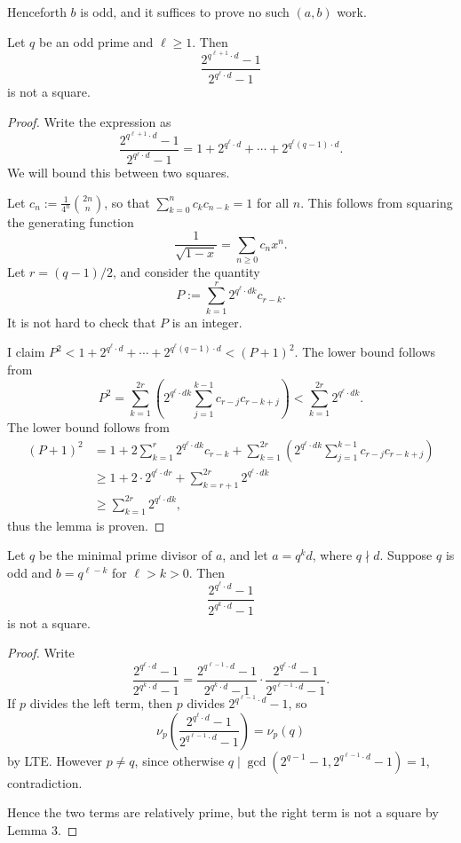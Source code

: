 Henceforth $b$ is odd, and it suffices to prove no such $(a,b)$ work.
\begin{lemma}[Problem for $a=q^\ell\cdot d$, $b=q$]
    Let $q$ be an odd prime and $\ell\ge1$. Then \[\frac{2^{q^{\ell+1}\cdot d}-1}{2^{q^\ell\cdot d}-1}\]
    is not a square.
\end{lemma}
\begin{proof}
    Write the expression as \[\frac{2^{q^{\ell+1}\cdot d}-1}{2^{q^\ell\cdot d}-1}=1+2^{q^\ell\cdot d}+\cdots+2^{q^\ell(q-1)\cdot d}.\]
    We will bound this between two squares.

    Let $c_n:=\frac1{4^n}\binom{2n}n$, so that $\sum_{k=0}^nc_kc_{n-k}=1$ for all $n$. This follows from squaring the generating function \[\frac1{\sqrt{1-x}}=\sum_{n\ge0}c_nx^n.\]
    Let $r=(q-1)/2$, and consider the quantity \[P:=\sum_{k=1}^r2^{q^\ell\cdot dk}c_{r-k}.\]
    It is not hard to check that $P$ is an integer.

    I claim $P^2<1+2^{q^\ell\cdot d}+\cdots+2^{q^\ell(q-1)\cdot d}<(P+1)^2$. The lower bound follows from \[P^2=\sum_{k=1}^{2r}\left(2^{q^{\ell}\cdot dk}\sum_{j=1}^{k-1}c_{r-j}c_{r-k+j}\right)<\sum_{k=1}^{2r}2^{q^\ell\cdot dk}.\]
    The lower bound follows from
    \begin{align*}
        (P+1)^2&=1+2\sum_{k=1}^r2^{q^\ell\cdot dk}c_{r-k}+\sum_{k=1}^{2r}\left(2^{q^\ell\cdot dk}\sum_{j=1}^{k-1}c_{r-j}c_{r-k+j}\right)\\
        &\ge1+2\cdot2^{q^\ell\cdot dr}+\sum_{k=r+1}^{2r}2^{q^\ell\cdot dk}\\
        &\ge\sum_{k=1}^{2r}2^{q^\ell\cdot dk},
    \end{align*}
    thus the lemma is proven.
\end{proof}
\begin{lemma}[Problem for $a=q^kd$, $b=q^{\ell-k}$]
    Let $q$ be the minimal prime divisor of $a$, and let $a=q^kd$, where $q\nmid d$. Suppose $q$ is odd and $b=q^{\ell-k}$ for $\ell>k>0$. Then \[\frac{2^{q^{\ell}\cdot d}-1}{2^{q^k\cdot d}-1}\]
    is not a square.
\end{lemma}
\begin{proof}
    Write \[\frac{2^{q^{\ell}\cdot d}-1}{2^{q^k\cdot d}-1}=\frac{2^{q^{\ell-1}\cdot d}-1}{2^{q^k\cdot d}-1}\cdot\frac{2^{q^{\ell}\cdot d}-1}{2^{q^{\ell-1}\cdot d}-1}.\]
    If $p$ divides the left term, then $p$ divides $2^{q^{\ell-1}\cdot d}-1$, so \[\nu_p\left(\frac{2^{q^\ell\cdot d}-1}{2^{q^{\ell-1}\cdot d}-1}\right)=\nu_p(q)\]
    by LTE. However $p\ne q$, since otherwise $q\mid\gcd\left(2^{q-1}-1,2^{q^{\ell-1}\cdot d}-1\right)=1$, contradiction.

    Hence the two terms are relatively prime, but the right term is not a square by Lemma 3.
\end{proof}
